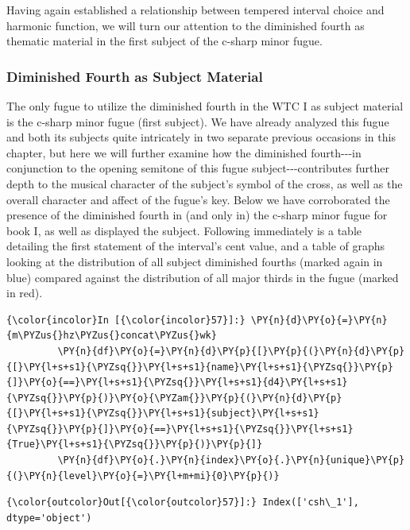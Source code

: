 Having again established a relationship between tempered interval choice
and harmonic function, we will turn our attention to the diminished
fourth as thematic material in the first subject of the c-sharp minor
fugue.

    \subsubsection{Diminished Fourth as Subject
Material}\label{diminished-fourth-as-subject-material}

The only fugue to utilize the diminished fourth in the WTC I as subject
material is the c-sharp minor fugue (first subject). We have already
analyzed this fugue and both its subjects quite intricately in two
separate previous occasions in this chapter, but here we will further
examine how the diminished fourth-\/-\/-in conjunction to the opening
semitone of this fugue subject-\/-\/-contributes further depth to the
musical character of the subject's symbol of the cross, as well as the
overall character and affect of the fugue's key. Below we have
corroborated the presence of the diminished fourth in (and only in) the
c-sharp minor fugue for book I, as well as displayed the subject.
Following immediately is a table detailing the first statement of the
interval's cent value, and a table of graphs looking at the distribution
of all subject diminished fourths (marked again in blue) compared
against the distribution of all major thirds in the fugue (marked in
red).

    \begin{Verbatim}[commandchars=\\\{\}]
{\color{incolor}In [{\color{incolor}57}]:} \PY{n}{d}\PY{o}{=}\PY{n}{m\PYZus{}hz\PYZus{}concat\PYZus{}wk}
         \PY{n}{df}\PY{o}{=}\PY{n}{d}\PY{p}{[}\PY{p}{(}\PY{n}{d}\PY{p}{[}\PY{l+s+s1}{\PYZsq{}}\PY{l+s+s1}{name}\PY{l+s+s1}{\PYZsq{}}\PY{p}{]}\PY{o}{==}\PY{l+s+s1}{\PYZsq{}}\PY{l+s+s1}{d4}\PY{l+s+s1}{\PYZsq{}}\PY{p}{)}\PY{o}{\PYZam{}}\PY{p}{(}\PY{n}{d}\PY{p}{[}\PY{l+s+s1}{\PYZsq{}}\PY{l+s+s1}{subject}\PY{l+s+s1}{\PYZsq{}}\PY{p}{]}\PY{o}{==}\PY{l+s+s1}{\PYZsq{}}\PY{l+s+s1}{True}\PY{l+s+s1}{\PYZsq{}}\PY{p}{)}\PY{p}{]}
         \PY{n}{df}\PY{o}{.}\PY{n}{index}\PY{o}{.}\PY{n}{unique}\PY{p}{(}\PY{n}{level}\PY{o}{=}\PY{l+m+mi}{0}\PY{p}{)}
\end{Verbatim}
\begin{Verbatim}[commandchars=\\\{\}]
{\color{outcolor}Out[{\color{outcolor}57}]:} Index(['csh\_1'], dtype='object')
\end{Verbatim}


